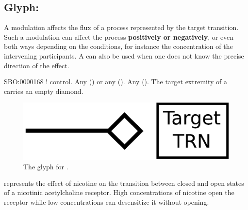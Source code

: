 \subsection{Glyph: }\label{sec:modulation}

A modulation affects the flux of a process
represented by the target transition. Such a modulation can affect the
process \textbf{positively or negatively}, or even both ways depending on the
conditions, for instance the concentration of the intervening
participants. A  can also be used when one does not know the precise direction of the effect.

\begin{glyphDescription}
 \glyphSboTerm SBO:0000168 ! control.
 \glyphOrigin Any  () or any  ().
 \glyphTarget Any  ().
 \glyphEndPoint The target extremity of a  carries an empty diamond.
 \end{glyphDescription}

\begin{figure}[H]
  \centering
  \includegraphics[scale = 0.5]{images/modulation}
  \caption{The \PD glyph for .}
  \label{fig:modulation}
\end{figure}

 represents the effect of nicotine on the transition between closed and open states of a nicotinic acetylcholine receptor. High concentrations of nicotine open the receptor while low concentrations can desensitize it without opening. 

